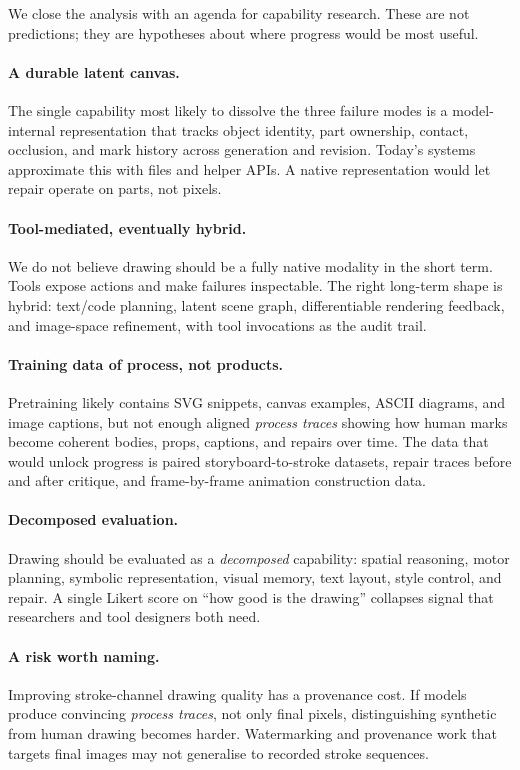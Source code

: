 \documentclass[10pt,twocolumn]{article}
\begin{document}
We close the analysis with an agenda for capability research. These
are not predictions; they are hypotheses about where progress would
be most useful.

\paragraph{A durable latent canvas.} The single capability most
likely to dissolve the three failure modes is a model-internal
representation that tracks object identity, part ownership, contact,
occlusion, and mark history across generation and revision. Today's
systems approximate this with files and helper APIs. A native
representation would let repair operate on parts, not pixels.

\paragraph{Tool-mediated, eventually hybrid.} We do not believe
drawing should be a fully native modality in the short term. Tools
expose actions and make failures inspectable. The right long-term
shape is hybrid: text/code planning, latent scene graph,
differentiable rendering feedback, and image-space refinement, with
tool invocations as the audit trail.

\paragraph{Training data of process, not products.} Pretraining
likely contains SVG snippets, canvas examples, ASCII diagrams, and
image captions, but not enough aligned \emph{process traces} showing
how human marks become coherent bodies, props, captions, and repairs
over time. The data that would unlock progress is paired
storyboard-to-stroke datasets, repair traces before and after
critique, and frame-by-frame animation construction data.

\paragraph{Decomposed evaluation.} Drawing should be evaluated as a
\emph{decomposed} capability: spatial reasoning, motor planning,
symbolic representation, visual memory, text layout, style control,
and repair. A single Likert score on ``how good is the drawing''
collapses signal that researchers and tool designers both need.

\paragraph{A risk worth naming.} Improving stroke-channel drawing
quality has a provenance cost. If models produce convincing
\emph{process traces}, not only final pixels, distinguishing
synthetic from human drawing becomes harder. Watermarking and
provenance work that targets final images may not generalise to
recorded stroke sequences.
\end{document}
